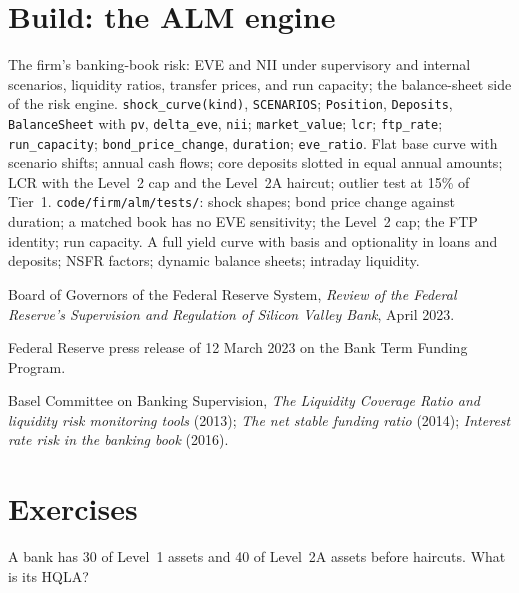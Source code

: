 \section{Build: the ALM engine}\label{bld:rc:liquidity-and-funding-risk-bank-treasury:alm}

\begin{build}
 The firm's banking-book risk: EVE and NII under supervisory and internal scenarios,
liquidity ratios, transfer prices, and run capacity; the balance-sheet side of the risk engine.
 \texttt{shock\_curve(kind)}, \texttt{SCENARIOS}; \texttt{Position},
\texttt{Deposits}, \texttt{BalanceSheet} with \texttt{pv}, \texttt{delta\_eve}, \texttt{nii};
\texttt{market\_value}; \texttt{lcr}; \texttt{ftp\_rate}; \texttt{run\_capacity};
\texttt{bond\_price\_change}, \texttt{duration}; \texttt{eve\_ratio}.
 Flat base curve with scenario shifts; annual cash flows; core deposits slotted in equal
annual amounts; LCR with the Level~2 cap and the Level~2A haircut; outlier test at 15\% of Tier~1.
 \texttt{code/firm/alm/tests/}: shock shapes; bond price change against
duration; a matched book has no EVE sensitivity; the Level~2 cap; the FTP identity; run capacity.
 A full yield curve with basis and optionality in loans and deposits; NSFR factors;
dynamic balance sheets; intraday liquidity.
\end{build}

\begin{omsources}
\item Board of Governors of the Federal Reserve System, \emph{Review of the Federal Reserve's
Supervision and Regulation of Silicon Valley Bank}, April 2023.
\item Federal Reserve press release of 12 March 2023 on the Bank Term Funding Program.
\item Basel Committee on Banking Supervision, \emph{The Liquidity Coverage Ratio and liquidity risk
monitoring tools} (2013); \emph{The net stable funding ratio} (2014); \emph{Interest rate risk in the
banking book} (2016).
\end{omsources}

\section{Exercises}

\begin{exercise}[$\star$]\label{exo:rc:liquidity-and-funding-risk-bank-treasury:1}
A bank has 30 of Level~1 assets and 40 of Level~2A assets before haircuts. What is its HQLA?
\end{exercise}

